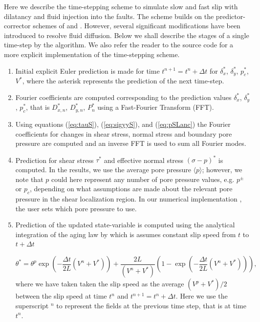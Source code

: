 \documentclass[draft]{agujournal2019}
\begin{document}
Here we describe the time-stepping scheme to simulate slow and fast slip with dilatancy and fluid injection into the faults. The scheme builds on the predictor-corrector schemes of  and .  However, several significant modifications have been introduced to resolve fluid diffusion. Below we shall describe the stages of a single time-step by the algorithm. We also refer the reader to the source code \cite{elias_rafn_heimisson_Poro_SBIM} for a more explicit implementation of the time-stepping scheme. 
\begin{enumerate}

\item Initial explicit Euler prediction is made for time $t^{n+1} = t^n + \Delta t$ for $\delta_x^*$, $\delta_y^*$, $p_c^*$, $V^*$, where the asterisk represents the prediction of the next time-step.

\item Fourier coefficients are computed corresponding to the prediction values $\delta_x^*$, $\delta_y^*$, $p_c^*$, that is $D_{x,n}^*$, $D_{y,n}^*$, $P_{n}^*$ using a Fast-Fourier Transform (FFT).

\item Using equations (\ref{eq:tauS}), (\ref{eq:sigyyS}), and (\ref{eq:pSLanc}) the Fourier coefficients for changes in shear stress, normal stress and boundary pore pressure are computed and an inverse FFT is used to sum all Fourier modes.

\item Prediction for shear stress $\tau^*$ and effective normal stress $(\sigma - p)^*$ is computed. In the results, we use the average pore pressure $\langle p \rangle$; however, we note that $p$ could here represent any number of pore pressure values, e.g. $p^\pm$ or $p_c$, depending on what assumptions are made about the relevant pore pressure in the shear localization region. In our numerical implementation \cite{elias_rafn_heimisson_Poro_SBIM}, the user sets which pore pressure to use.

\item Prediction of the updated state-variable is computed using the analytical integration of the aging law by  which is assumes constant slip speed from $t$ to $t + \Delta t$ 

\begin{equation}
    \theta^* = \theta^p \exp \left( - \frac{\Delta t}{2 L} (V^n + V^*)  \right) + \frac{2 L}{(V^n + V^*)} \left( 1 - \exp \left( - \frac{\Delta t}{2 L} (V^n + V^*)  \right)  \right),
\end{equation}
where we have taken taken the slip speed as the average $(V^p + V^*)/2$ between the slip speed at time $t^n$ and $t^{n+1} = t^n + \Delta t$. Here we use the superscript $^n$ to represent the fields at the previous time step, that is at time $t^n$.


\end{enumerate}
\end{document}
